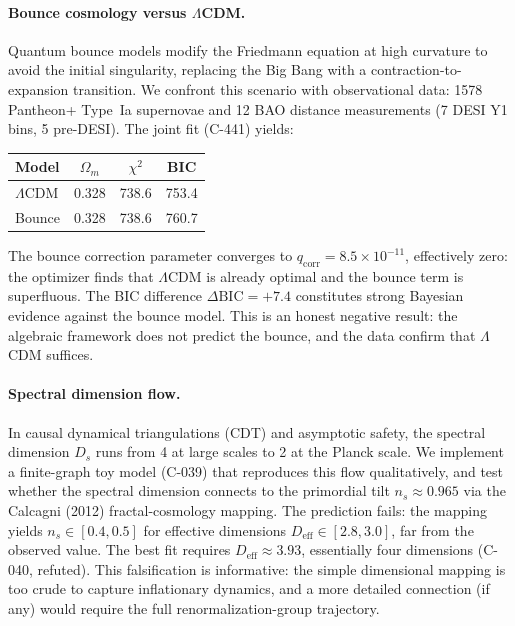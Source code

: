 \documentclass[12pt,openany]{report}
\theoremstyle{definition}
\theoremstyle{plain}
\theoremstyle{remark}
\begin{document}
\paragraph{Bounce cosmology versus $\Lambda$CDM.}
Quantum bounce models modify the Friedmann equation at high curvature
to avoid the initial singularity, replacing the Big Bang with a
contraction-to-expansion transition.  We confront this scenario with
observational data: 1578 Pantheon+ Type~Ia supernovae and 12 BAO
distance measurements (7 DESI Y1 bins, 5 pre-DESI).  The joint fit
(C-441) yields:
\begin{center}
\begin{tabular}{lccc}
\toprule
\textbf{Model} & $\Omega_m$ & $\chi^2$ & BIC \\
\midrule
$\Lambda$CDM & 0.328 & 738.6 & 753.4 \\
Bounce        & 0.328 & 738.6 & 760.7 \\
\bottomrule
\end{tabular}
\end{center}
The bounce correction parameter converges to $q_{\mathrm{corr}} =
8.5 \times 10^{-11}$, effectively zero: the optimizer finds that
$\Lambda$CDM is already optimal and the bounce term is superfluous.
The BIC difference $\Delta\mathrm{BIC} = +7.4$ constitutes strong
Bayesian evidence against the bounce model.  This is an honest negative
result: the algebraic framework does not predict the bounce, and the
data confirm that $\Lambda$CDM suffices.

\paragraph{Spectral dimension flow.}
In causal dynamical triangulations (CDT) and asymptotic safety,
the spectral dimension $D_s$ runs from 4 at large scales to 2 at the
Planck scale.  We implement a finite-graph toy model (C-039) that
reproduces this flow qualitatively, and test whether the spectral
dimension connects to the primordial tilt $n_s \approx 0.965$ via the
Calcagni (2012) fractal-cosmology mapping.  The prediction fails:
the mapping yields $n_s \in [0.4, 0.5]$ for effective dimensions
$D_{\mathrm{eff}} \in [2.8, 3.0]$, far from the observed value.
The best fit requires $D_{\mathrm{eff}} \approx 3.93$, essentially
four dimensions (C-040, refuted).  This falsification is informative:
the simple dimensional mapping is too crude to capture inflationary
dynamics, and a more detailed connection (if any) would require the
full renormalization-group trajectory.
\end{document}
